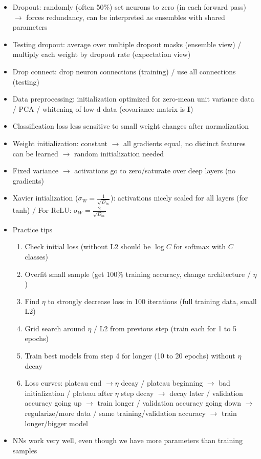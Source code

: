 \documentclass[11pt]{scrartcl}
\begin{document}
\begin{itemize}
    \item Dropout: randomly (often 50\%) set neurons to zero (in each forward pass) 
        \( \rightarrow \) forces redundancy, can be interpreted as ensembles with shared 
        parameters
    \item Testing dropout: average over multiple dropout masks (ensemble view) / multiply 
        each weight by dropout rate (expectation view)
    \item Drop connect: drop neuron connections (training) / use all connections (testing)
    \item Data preprocessing: initialization optimized for zero-mean unit variance data / 
        PCA / whitening of low-d data (covariance matrix is \( \bm{I} \))
    \item Classification loss less sensitive to small weight changes after normalization
    \item Weight initialization: constant \( \rightarrow \) all gradients equal, no distinct 
        features can be learned \( \rightarrow \) random initialization needed
    \item Fixed variance \( \rightarrow \) activations go to zero/saturate over deep layers 
        (no gradients)
    \item Xavier intialization (\( \sigma_W = \frac{1}{\sqrt{D_{\mathrm{in}}}} \)): 
        activations nicely scaled for all layers (for tanh) / For ReLU: \( \sigma_W = 
        \frac{2}{\sqrt{D_{\mathrm{in}}}} \)
    \item Practice tips 
        \begin{enumerate}
            \item Check initial loss (without L2 should be \( \log C \) for softmax with 
                \( C \) classes)
            \item Overfit small sample (get 100\% training accuracy, change architecture / 
                \( \eta \))
            \item Find \( \eta \) to strongly decrease loss in 100 iterations (full training 
                data, small L2)
            \item Grid search around \( \eta \) / L2 from previous step (train each for 1 to 
                5 epochs)
            \item Train best models from step 4 for longer (10 to 20 epochs) without 
                \( \eta \) decay
            \item Loss curves: plateau end \( \rightarrow \eta \) decay / plateau beginning 
                \( \rightarrow \) bad initialization / plateau after \( \eta \) step decay 
                \( \rightarrow \) decay later / validation accuracy going up \( \rightarrow \) 
                train longer / validation accuracy going down \( \rightarrow \) 
                regularize/more data / same training/validation accuracy \( \rightarrow \) 
                train longer/bigger model
        \end{enumerate}
        \item NNs work very well, even though we have more parameters than training samples
\end{itemize}
\end{document}
